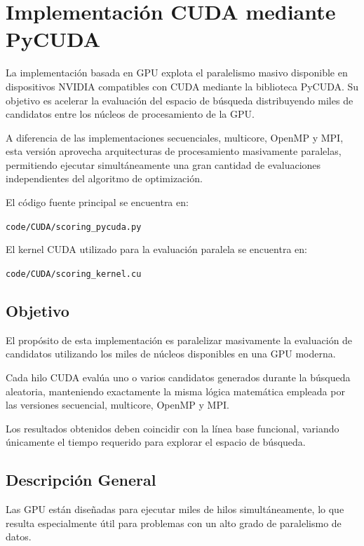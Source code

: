 \chapter{Implementación CUDA mediante PyCUDA}

La implementación basada en GPU explota el paralelismo masivo disponible en dispositivos NVIDIA compatibles con CUDA mediante la biblioteca PyCUDA. Su objetivo es acelerar la evaluación del espacio de búsqueda distribuyendo miles de candidatos entre los núcleos de procesamiento de la GPU.

A diferencia de las implementaciones secuenciales, multicore, OpenMP y MPI, esta versión aprovecha arquitecturas de procesamiento masivamente paralelas, permitiendo ejecutar simultáneamente una gran cantidad de evaluaciones independientes del algoritmo de optimización.

El código fuente principal se encuentra en:

\begin{center}
\texttt{code/CUDA/scoring\_pycuda.py}
\end{center}

El kernel CUDA utilizado para la evaluación paralela se encuentra en:

\begin{center}
\texttt{code/CUDA/scoring\_kernel.cu}
\end{center}

\section{Objetivo}

El propósito de esta implementación es paralelizar masivamente la evaluación de candidatos utilizando los miles de núcleos disponibles en una GPU moderna.

Cada hilo CUDA evalúa uno o varios candidatos generados durante la búsqueda aleatoria, manteniendo exactamente la misma lógica matemática empleada por las versiones secuencial, multicore, OpenMP y MPI.

Los resultados obtenidos deben coincidir con la línea base funcional, variando únicamente el tiempo requerido para explorar el espacio de búsqueda.

\section{Descripción General}

Las GPU están diseñadas para ejecutar miles de hilos simultáneamente, lo que resulta especialmente útil para problemas con un alto grado de paralelismo de datos.

